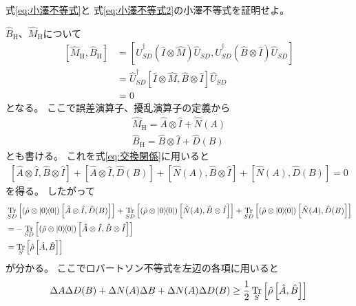 \documentclass[a4paper, 10pt, uplatex]{jsarticle}
\begin{document}
\begin{problem}
	式\eqref{eq:小澤不等式}と
	式\eqref{eq:小澤不等式2}の小澤不等式を証明せよ。

	\tcblower

	$\hat{B}_\mathrm{H}$、$\hat{M}_\mathrm{H}$について
	\begin{align}
		\left[ \hat{M}_\mathrm{H}, \hat{B}_\mathrm{H} \right]
		&= \left[ \hat{U}^\dagger_{SD} \left( \hat{I} \otimes \hat{M} \right)
		\hat{U}_{SD}, \hat{U}^\dagger_{SD}
		\left( \hat{B} \otimes \hat{I} \right) \hat{U}_{SD} \right] \\
		&= \hat{U}^\dagger_{SD} \left[ \hat{I} \otimes \hat{M},
		\hat{B} \otimes \hat{I} \right] \hat{U}_{SD} \\
		&= 0
		\label{eq:交換関係}
	\end{align}
	となる。
	ここで誤差演算子、擾乱演算子の定義から
	\begin{gather}
		\hat{M}_\mathrm{H}
		= \hat{A} \otimes \hat{I} + \hat{N} (A) \\
		\hat{B}_\mathrm{H}
		= \hat{B} \otimes \hat{I} + \hat{D} (B)
	\end{gather}
	とも書ける。
	これを式\eqref{eq:交換関係}に用いると
	\begin{align}
		\left[ \hat{A} \otimes \hat{I}, \hat{B} \otimes \hat{I} \right]
		+ \left[ \hat{A} \otimes \hat{I}, \hat{D}(B) \right]
		+ \left[ \hat{N}(A), \hat{B} \otimes \hat{I} \right]
		+ \left[ \hat{N}(A), \hat{D}(B) \right]
		= 0
	\end{align}
	を得る。
	したがって
	\begin{align}
		&\Tr_{SD} \left[ \left( \hat{\rho} \otimes \Ketbra{0}{0} \right)
		\left[ \hat{A} \otimes \hat{I}, \hat{D}(B) \right] \right]
		+ \Tr_{SD} \left[ \left( \hat{\rho} \otimes \Ketbra{0}{0} \right)
		\left[ \hat{N}(A), \hat{B} \otimes \hat{I} \right] \right]
		+ \Tr_{SD} \left[ \left( \hat{\rho} \otimes \Ketbra{0}{0} \right)
		\left[ \hat{N}(A), \hat{D}(B) \right] \right] \\
		&= - \Tr_{SD} \left[ \left( \hat{\rho} \otimes \Ketbra{0}{0} \right)
		\left[ \hat{A} \otimes \hat{I}, \hat{B} \otimes \hat{I} \right]
		\right] \\
		&= \Tr_S \left[ \hat{\rho} \left[ \hat{A}, \hat{B} \right] \right]
	\end{align}
	が分かる。
	ここでロバートソン不等式を左辺の各項に用いると
	\begin{align}
		\Delta A \Delta D(B) + \Delta N(A) \Delta B + \Delta N(A) \Delta D(B)
		\geq \frac{1}{2}
		\Tr_S \left[ \hat{\rho} \left[ \hat{A}, \hat{B} \right] \right]

\end{align}
\end{problem}
\end{document}
